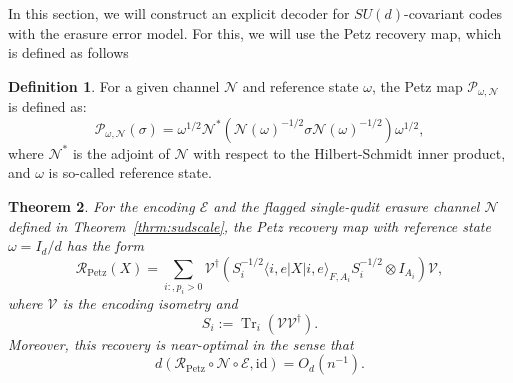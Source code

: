 \documentclass[10pt,twocolumn,superscriptaddress,aps,amsmath,amssymb,citeautoscript,floatfix,prx]{revtex4-2}
\theoremstyle{plain}
\theoremstyle{plain}
\theoremstyle{plain}
\theoremstyle{plain}
\theoremstyle{plain}
\theoremstyle{plain}
\theoremstyle{plain}
\newtheorem{smtheorem}{Theorem}[section]
\theoremstyle{definition}
\newtheorem{smdefinition}[smtheorem]{Definition}
\theoremstyle{plain}
\begin{document}
\begin{appendix}
In this section, we will construct an explicit decoder for $SU(d)$-covariant codes with the erasure error model.
For this, we will use the Petz recovery map, which is defined as follows
\begin{smdefinition}
    For a given channel $\mathcal{N}$ and reference state $\omega$, the Petz map $\mathcal{P}_{\omega, \mathcal{N}}$ is defined as:
    \[
        \mathcal{P}_{\omega, \mathcal{N}}(\sigma)=\omega^{1 / 2} \mathcal{N}^*\left(\mathcal{N}(\omega)^{-1 / 2} \sigma \mathcal{N}(\omega)^{-1 / 2}\right) \omega^{1 / 2},
    \]
    where $\mathcal{N}^*$ is the adjoint of $\mathcal{N}$ with respect to the Hilbert-Schmidt inner product, and $\omega$ is so-called reference state.
\end{smdefinition}

\begin{smtheorem}\label{thm:petz_decoder_explicit}
For the encoding $\mathcal E$ and the flagged single-qudit erasure channel $\mathcal N$ defined in Theorem~\ref{thrm:sudscale}, 
the Petz recovery map with reference state $\omega=I_d/d$ has the form
$$
\mathcal R_{\mathrm{Petz}}(X)
=
\sum_{i:,p_i>0}
\mathcal{V}^\dagger
\left(
S_i^{-1/2}
\langle i,e|X|i,e\rangle_{F,A_i}
S_i^{-1/2}
\otimes I_{A_i}
\right)
\mathcal{V},
$$
where $\mathcal{V}$ is the encoding isometry and
$$
S_i
:=
\operatorname{Tr}_i\left(\mathcal{V}\mathcal{V}^\dagger\right).
$$
Moreover, this recovery is near-optimal in the sense that
$$
    d\left(
    \mathcal R_{\mathrm{Petz}}
    \circ
    \mathcal N
    \circ
    \mathcal E,
    \mathrm{id}
    \right)
    =
    O_{d}(n^{-1}) .
$$
\end{smtheorem}


\end{appendix}
\end{document}
